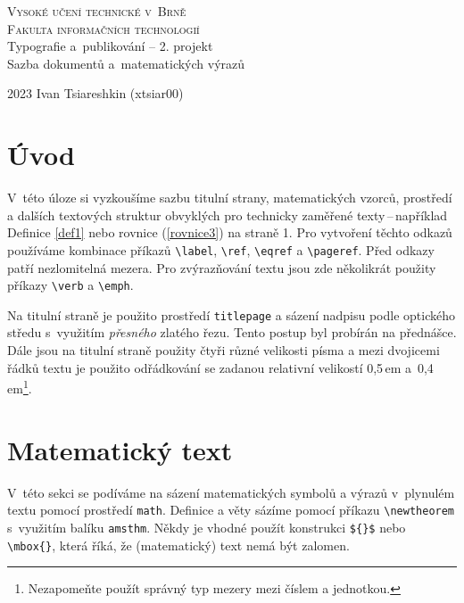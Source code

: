 \documentclass[a4paper, 11pt, twocolumn]{article}
\begin{document}
\begin{titlepage}
    \begin{center}
        \textsc{\Huge Vysoké učení technické v~Brně \\[0.5em]}
        \textsc{\huge Fakulta informačních technologií} \\
        {\LARGE Typografie a~publikování -- 2. projekt \\[0.4em]
        Sazba dokumentů a~matematických výrazů} \\
    \end{center}
    \Large{2023 \hfill Ivan Tsiareshkin (xtsiar00)} 
\end{titlepage}

\newpage
\section*{Úvod}
    V~této úloze si vyzkoušíme sazbu titulní strany, matematických vzorců, prostředí a dalších textových struktur obvyklých pro technicky zaměřené texty\,--\,například Definice \ref{def1} nebo rovnice (\ref{rovnice3}) na straně 1. Pro vytvoření těchto
    odkazů používáme kombinace příkazů \verb|\label|, \verb|\ref|, \verb|\eqref| a \verb|\pageref|. Před odkazy patří nezlomitelná mezera. Pro zvýrazňování textu jsou zde několikrát použity příkazy \verb|\verb| a \verb|\emph|.

    Na titulní straně je použito prostředí \verb|titlepage| a sázení nadpisu podle optického středu s~využitím \textit{přesného} zlatého řezu. Tento postup byl probírán na přednášce. Dále jsou na titulní straně použity čtyři různé velikosti písma a mezi dvojicemi řádků textu je použito odřádkování se zadanou relativní velikostí 0,5\,em a~0,4\,em\footnote{Nezapomeňte použít správný typ mezery mezi číslem a jednotkou.}.
    
\section{Matematický text}
    V~této sekci se podíváme na sázení matematických symbolů a výrazů v~plynulém textu pomocí prostředí \texttt{math}. Definice a věty sázíme pomocí příkazu \verb|\newtheorem| s~využitím balíku \texttt{amsthm}. Někdy je vhodné použít konstrukci \verb|${}$| nebo \verb|\mbox{}|, která říká, že (matematický) text nemá být zalomen.
\end{document}
